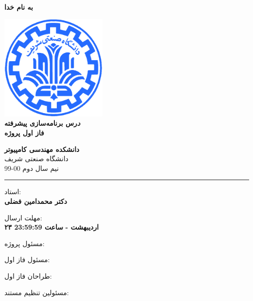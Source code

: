 \documentclass[]{article}
\begin{document}
\begin{titlepage}
\begin{center}

\textbf{ \Huge{به نام خدا} }
        
\vspace{0.2cm}

\includegraphics[width=0.4\textwidth]{sharif1.png}\\
\vspace{0.2cm}
\textbf{ \Huge{\emph درس برنامه‌سازی پیشرفته} }\\
\vspace{0.25cm}
\textbf{ \Large{ فاز اول پروژه} }
\vspace{0.2cm}
       
 
      \large \textbf{دانشکده مهندسی کامپیوتر}\\\vspace{0.1cm}
    \large   دانشگاه صنعتی شریف\\\vspace{0.2cm}
       \large   ﻧﯿﻢ سال دوم 00-99 \\\vspace{0.10cm}
      \noindent\rule[1ex]{\linewidth}{1pt}
استاد:\\
    \textbf{{دکتر محمدامین فضلی}}



    \vspace{0.20cm}

   مهلت ارسال:\\
    \textbf{{۲۳ اردیبهشت - }}
    \textbf{{ساعت 23:59:59}}

    \vspace{0.10cm}
مسئول پروژه:\\
    \textbf{}
    
        \vspace{0.10cm}
مسئول فاز اول:\\
    \textbf{}
    
        \vspace{0.10cm}
طراحان فاز اول:\\
    \textbf{}
    
        \vspace{0.05cm}
مسئولین تنظیم مستند:\\
    \textbf{}
    

\end{center}
\end{titlepage}
\end{document}
